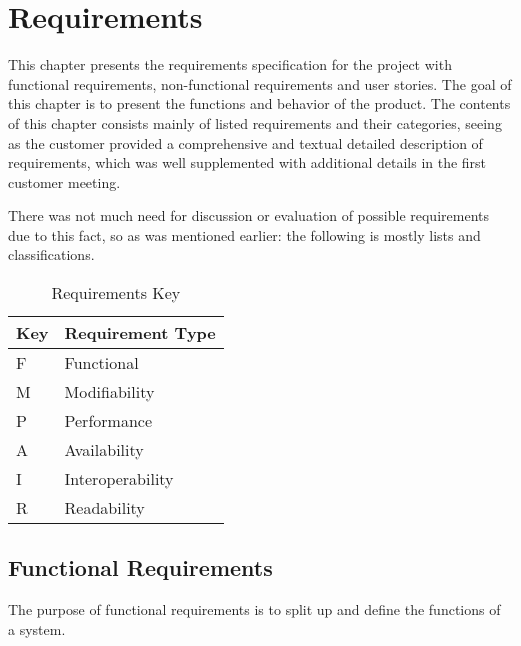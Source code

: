 \chapter{Requirements}
This chapter presents the requirements specification for the project with functional requirements, non-functional requirements and user stories. The goal of this chapter is to present the functions and behavior of the product. The contents of this chapter consists mainly of listed requirements and their categories, seeing as the customer provided a comprehensive and textual detailed description of requirements,
which was well supplemented with additional details in the first customer meeting.

There was not much need for discussion or evaluation of possible requirements due to this fact, so as was mentioned earlier: the following is mostly lists and classifications.
\newpage

 \normalsize

\begin{table}[H]
\begin{center}
\begin{tabular}{|p{1.5cm}|p{6cm}|}
	\hline
	\textbf{Key} & \textbf{Requirement Type} \\
	\hline
	F & Functional\\
	\hline
	M & Modifiability\\
	\hline
	P & Performance\\
	\hline
	A & Availability\\
	\hline
	I & Interoperability\\
	\hline
	R & Readability\\
	
	\hline
\end{tabular}
\end{center}
\caption{Requirements Key}
\end{table}


\section{Functional Requirements}
The purpose of functional requirements is to split up and define the functions of a system. 

 \normalsize

